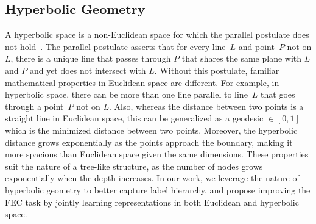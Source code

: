 
\subsection{Hyperbolic Geometry}
A hyperbolic space is a non-Euclidean space for which the parallel
postulate does not hold~\cite{2021_hyper_survey, dhingra-etal-2018-embedding-text-hyper}.
The parallel postulate asserts that for every line~$L$ and 
point~$P$ not on $L$, there is a unique line that passes through $P$ that shares the same
plane with $L$ and $P$ and yet does not intersect with $L$. Without this
postulate, familiar mathematical properties in Euclidean space are
different. For example, in hyperbolic space, there can be more than one
line parallel to line~$L$ that goes through a point~$P$ not on $L$. Also,
whereas the distance between two points is a straight line in Euclidean space, this can
be generalized as a geodesic $\in [0, 1]$ which is the minimized distance
between two points. Moreover, the hyperbolic distance grows exponentially as
the points approach the boundary, making it more spacious than
Euclidean space given the same dimensions. These properties suit the nature of a tree-like structure, as the number of nodes grows exponentially
when the depth increases. In our work, we leverage the nature of hyperbolic
geometry to better capture label hierarchy, and propose improving the FEC task by jointly learning representations in both
Euclidean and hyperbolic space.

